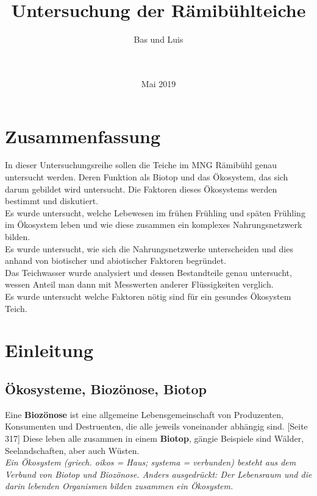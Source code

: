 \documentclass{article}
\title{\Huge{Untersuchung der Rämibühlteiche}}
\author{ \huge{Bas und Luis} \\ \\ \\
         \centering{\texttt{[image: Teichtitelbild.JPG]}}}
\date{Mai 2019}
\begin{document}
\maketitle

\newpage


\centering \section{Zusammenfassung}
In dieser Untersuchungsreihe sollen die Teiche im MNG Rämibühl genau untersucht werden. Deren Funktion als Biotop und das Ökosystem, das sich darum gebildet wird untersucht. Die Faktoren dieses Ökosystems werden bestimmt und diskutiert. \\
\vspace{5mm}
Es wurde untersucht, welche Lebewesen im frühen Frühling und späten Frühling im Ökosystem leben und wie diese zusammen ein komplexes Nahrungsnetzwerk bilden. \\
\vspace{5mm}
Es wurde untersucht, wie sich die Nahrungsnetzwerke unterscheiden und dies anhand von biotischer und abiotischer Faktoren begründet. \\
\vspace{5mm}
Das Teichwasser wurde analysiert und dessen Bestandteile genau untersucht, wessen Anteil man dann mit Messwerten anderer Flüssigkeiten verglich. \\
\vspace{5mm}
Es wurde untersucht welche Faktoren nötig sind für ein gesundes Ökosystem Teich. \\


\section{Einleitung}

    \subsection{Ökosysteme, Biozönose, Biotop}
        
        Eine \textbf{Biozönose} ist eine allgemeine Lebensgemeinschaft von Produzenten, Konsumenten und Destruenten, die alle jeweils voneinander abhängig sind. \cite{Biobuch}[Seite 317]
        Diese leben alle zusammen in einem \textbf{Biotop}, gängie Beispiele sind Wälder, Seelandschaften, aber auch Wüsten. \\
        \vspace{5mm}
        \textit{
        Ein Ökosystem (griech. oikos = Haus; systema = verbunden) besteht aus dem Verbund von Biotop und Biozönose. Anders ausgedrückt: Der Lebensraum und die darin lebenden Organismen bilden zusammen ein Ökosystem. \cite{Biologie-schule.de} } \\
        
\end{document}
